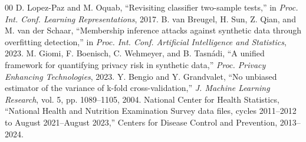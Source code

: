 \documentclass[conference]{IEEEtran}
\begin{document}
\begin{thebibliography}{00}
 D. Lopez-Paz and M. Oquab, ``Revisiting classifier two-sample tests,'' in \textit{Proc. Int. Conf. Learning Representations}, 2017.
 B. van Breugel, H. Sun, Z. Qian, and M. van der Schaar, ``Membership inference attacks against synthetic data through overfitting detection,'' in \textit{Proc. Int. Conf. Artificial Intelligence and Statistics}, 2023.
 M. Giomi, F. Boenisch, C. Wehmeyer, and B. Tasn\'adi, ``A unified framework for quantifying privacy risk in synthetic data,'' \textit{Proc. Privacy Enhancing Technologies}, 2023.
 Y. Bengio and Y. Grandvalet, ``No unbiased estimator of the variance of k-fold cross-validation,'' \textit{J. Machine Learning Research}, vol. 5, pp. 1089--1105, 2004.
 National Center for Health Statistics, ``National Health and Nutrition Examination Survey data files, cycles 2011--2012 to August 2021--August 2023,'' Centers for Disease Control and Prevention, 2013--2024.
\end{thebibliography}
\end{document}
